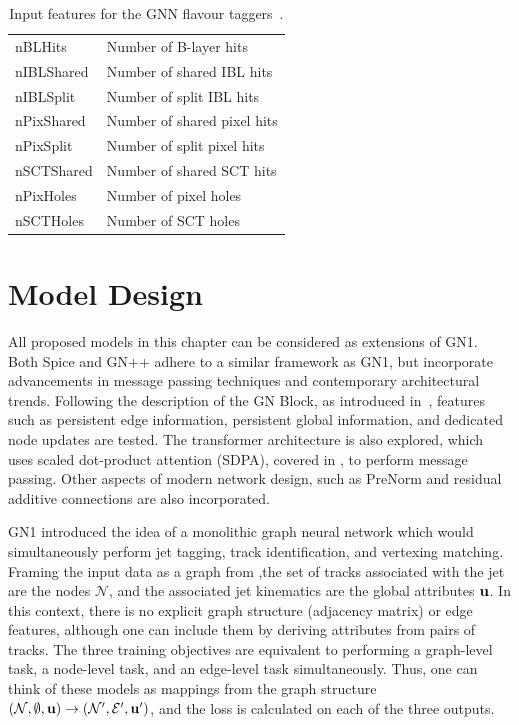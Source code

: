 \begin{table}[h]
\begin{tabular}{ll}
        nBLHits           & Number of B-layer hits                                              \\
        nIBLShared        & Number of shared IBL hits                                           \\
        nIBLSplit         & Number of split IBL hits                                            \\
        nPixShared        & Number of shared pixel hits                                         \\
        nPixSplit         & Number of split pixel hits                                          \\
        nSCTShared        & Number of shared SCT hits                                           \\
        nPixHoles         & Number of pixel holes                                               \\
        nSCTHoles         & Number of SCT holes                                                 \\
        \bottomrule
    \end{tabular}
    \caption{Input features for the GNN flavour taggers~\cite{GN1}.}
    \label{tab:track_features}
\end{table}

\section{Model Design}

All proposed models in this chapter can be considered as extensions of GN1.
Both Spice and GN++ adhere to a similar framework as GN1, but incorporate advancements in message passing techniques and contemporary architectural trends.
Following the description of the GN Block, as introduced in~\textcite{RelationalInductiveBiases}, features such as persistent edge information, persistent global information, and dedicated node updates are tested.
The transformer architecture is also explored, which uses scaled dot-product attention (SDPA), covered in , to perform message passing.
Other aspects of modern network design, such as PreNorm and residual additive connections are also incorporated.

GN1 introduced the idea of a monolithic graph neural network which would simultaneously perform jet tagging, track identification, and vertexing matching.
Framing the input data as a graph from ,the set of tracks associated with the jet are the nodes $\mathcal{N}$, and the associated jet kinematics are the global attributes $\mathbf{u}$.
In this context, there is no explicit graph structure (adjacency matrix) or edge features, although one can include them by deriving attributes from pairs of tracks.
The three training objectives are equivalent to performing a graph-level task, a node-level task, and an edge-level task simultaneously.
Thus, one can think of these models as mappings from the graph structure $(\mathcal{N}, \emptyset, \mathbf{u}) \rightarrow (\mathcal{N}', \mathcal{E}', \mathbf{u}')$, and the loss is calculated on each of the three outputs.

